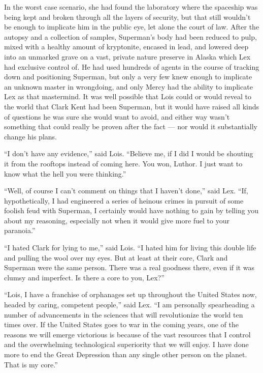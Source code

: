 In the worst case scenario, she had found the laboratory where the
spaceship was being kept and broken through all the layers of security,
but that still wouldn't be enough to implicate him in the public eye,
let alone the court of law. After the autopsy and a collection of
samples, Superman's body had been reduced to pulp, mixed with a healthy
amount of kryptonite, encased in lead, and lowered deep into an unmarked
grave on a vast, private nature preserve in Alaska which Lex had
exclusive control of. He had used hundreds of agents in the course of
tracking down and positioning Superman, but only a very few knew enough
to implicate an unknown master in wrongdoing, and only Mercy had the
ability to implicate Lex as that mastermind. It was well possible that
Lois could or would reveal to the world that Clark Kent had been
Superman, but it would have raised all kinds of questions he was sure
she would want to avoid, and either way wasn't something that could
really be proven after the fact --- nor would it substantially change
his plans.

``I don't have any evidence,'' said Lois. ``Believe me, if I did I would
be shouting it from the rooftops instead of coming here. You won,
Luthor. I just want to know what the hell you were thinking.''

``Well, of course I can't comment on things that I haven't done,'' said
Lex. ``If, hypothetically, I had engineered a series of heinous crimes
in pursuit of some foolish feud with Superman, I certainly would have
nothing to gain by telling you about my reasoning, especially not when
it would give more fuel to your paranoia.''

``I hated Clark for lying to me,'' said Lois. ``I hated him for living
this double life and pulling the wool over my eyes. But at least at
their core, Clark and Superman were the same person. There was a real
goodness there, even if it was clumsy and imperfect. Is there a core to
you, Lex?''

``Lois, I have a franchise of orphanages set up throughout the United
States now, headed by caring, competent people,'' said Lex. ``I am
personally spearheading a number of advancements in the sciences that
will revolutionize the world ten times over. If the United States goes
to war in the coming years, one of the reasons we will emerge victorious
is because of the vast resources that I control and the overwhelming
technological superiority that we will enjoy. I have done more to end
the Great Depression than any single other person on the planet. That is
my core.''

